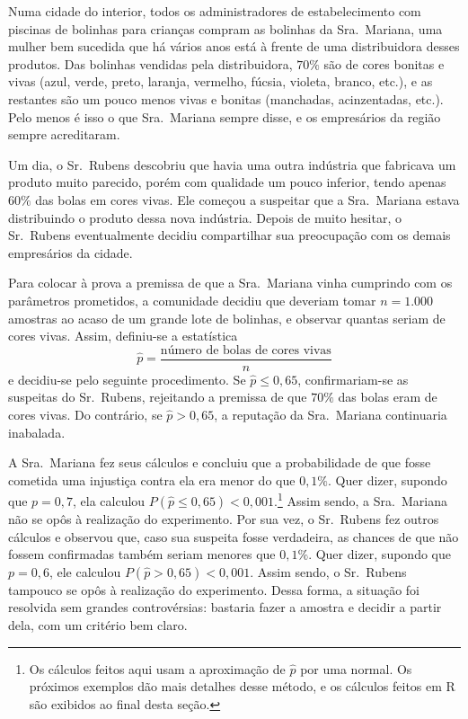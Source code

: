 \documentclass[12pt,a4paper]{article}
\theoremstyle{plain}
\theoremstyle{definition}
\theoremstyle{remark}
\newenvironment{example}{\pushQED{\qed}\renewcommand{\qedsymbol}{\scriptsize$\triangle$}\examplex}{\popQED\endexamplex}
\begin{document}
\begin{example}
\label{exp:facil}
Numa cidade do interior, todos os administradores de estabelecimento com piscinas de bolinhas para crianças compram as bolinhas da Sra.~Mariana, uma mulher bem sucedida que há vários anos está à frente de uma distribuidora desses produtos.
Das bolinhas vendidas pela distribuidora, $70\%$ são de cores bonitas e vivas (azul, verde, preto, laranja, vermelho, fúcsia, violeta, branco, etc.), e as restantes são um pouco menos vivas e bonitas (manchadas, acinzentadas, etc.).
Pelo menos é isso o que Sra.~Mariana sempre disse, e os empresários da região sempre acreditaram.

Um dia, o Sr.~Rubens descobriu que havia uma outra indústria que fabricava um produto muito parecido, porém com qualidade um pouco inferior, tendo apenas $60\%$ das bolas em cores vivas.
Ele começou a suspeitar que a Sra.~Mariana estava distribuindo o produto dessa nova indústria.
Depois de muito hesitar, o Sr.~Rubens eventualmente decidiu compartilhar sua preocupação com os demais empresários da cidade.

Para colocar à prova a premissa de que a Sra.~Mariana vinha cumprindo com os parâmetros prometidos, a comunidade decidiu que deveriam tomar $n=1.000$ amostras ao acaso de um grande lote de bolinhas, e observar quantas seriam de cores vivas.
Assim, definiu-se a estatística
\[
\hat{p} = \frac{\text{número de bolas de cores vivas}}{n}
\]
e decidiu-se pelo seguinte procedimento.
Se $\hat{p} \leq 0,65$, confirmariam-se as suspeitas do Sr.~Rubens, rejeitando a premissa de que $70\%$ das bolas eram de cores vivas.
Do contrário, se $\hat{p}>0,65$, a reputação da Sra.~Mariana continuaria inabalada.

A Sra.~Mariana fez seus cálculos e concluiu que a probabilidade de que fosse cometida uma injustiça contra ela era menor do que $0,1\%$.
Quer dizer, supondo que $p=0,7$, ela calculou $P(\hat{p} \leq 0,65) < 0,001$.\footnote{Os cálculos feitos aqui usam a aproximação de $\hat{p}$ por uma normal. Os próximos exemplos dão mais detalhes desse método, e os cálculos feitos em R são exibidos ao final desta seção.}
Assim sendo, a Sra.~Mariana não se opôs à realização do experimento.
Por sua vez, o Sr.~Rubens fez outros cálculos e observou que, caso sua suspeita fosse verdadeira, as chances de que não fossem confirmadas também seriam menores que $0,1\%$.
Quer dizer, supondo que $p=0,6$, ele calculou $P(\hat{p} > 0,65) < 0,001$.
Assim sendo, o Sr.~Rubens tampouco se opôs à realização do experimento.
Dessa forma, a situação foi resolvida sem grandes controvérsias: bastaria fazer a amostra e decidir a partir dela, com um critério bem claro.
\end{example}
\end{document}
